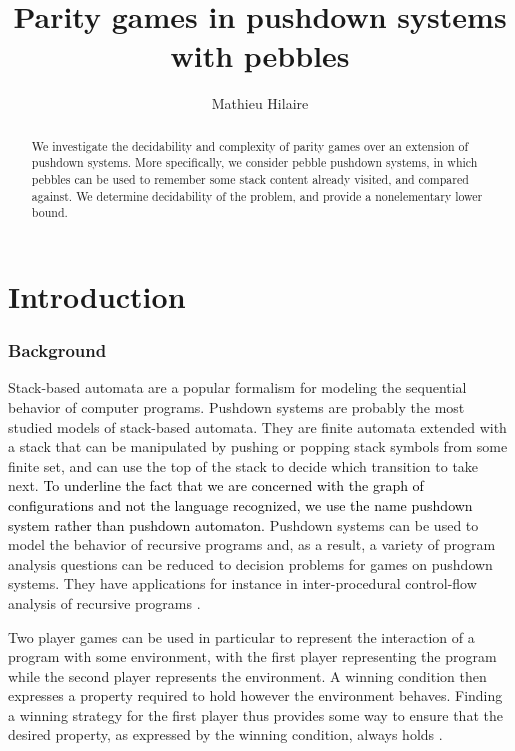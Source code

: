 \documentclass[a4paper,UKenglish,cleveref, autoref, thm-restate]{lipics-v2021}
\title{Parity games in pushdown systems with pebbles}
\author{Mathieu Hilaire}{Université Paris-Saclay\and
CNRS\and
ENS Paris-Saclay\and
Laboratoire Méthodes Formelles (LMF)\and
Gif-sur-Yvette, France
}{hilaire@lsv.fr}{}{This work was partly done while the author was supported by the 
Agence Nationale de la Recherche grant no.  ANR-17-CE40-0010.}
\begin{document}
\maketitle


\begin{abstract}
	We investigate the decidability and complexity of
	parity games over an extension of pushdown systems.
	More specifically, we consider pebble pushdown systems, in
	which pebbles can be used to remember some stack content already visited,
	and compared against.
	We determine decidability of the problem, and provide a nonelementary lower bound. 
\end{abstract}

\section{Introduction}

\subsubsection*{Background}



Stack-based automata are a popular formalism for modeling the sequential behavior of computer programs. 
Pushdown systems are probably the most studied models of stack-based automata.
They are
finite automata 
 extended with a stack that can be manipulated by pushing or popping stack symbols from some finite set, and can use the top of the stack to decide which transition to take next.
\textcolor{black}{To underline the fact that we are concerned with the graph of configurations and not the language recognized, we use the name pushdown system rather than pushdown automaton.}
Pushdown systems can be used to model the behavior of recursive programs and,
as a result, a variety of 
 program analysis questions can be reduced to decision problems for games on pushdown systems.
They have applications for instance in inter-procedural control-flow analysis of recursive programs \cite{esparza1999automata, reps2005weighted}.





Two player games can be used in particular to
 represent the
interaction of a program with some environment, with the first player representing the program while the second player represents the environment. A winning condition then expresses a property required to hold however the environment behaves. Finding a winning strategy for the first player
thus provides some way 
 to ensure that the desired 
property, as expressed by the winning condition,
always holds \cite{arnold2003games}.
\end{document}
